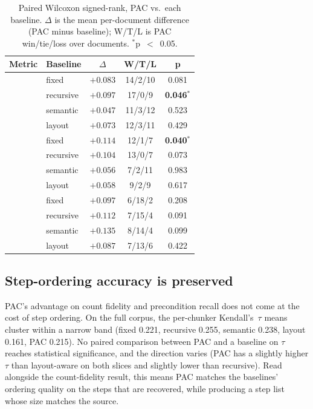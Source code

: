 \documentclass[fleqn,10pt]{wlscirep}
\begin{document}
\begin{table}[ht]
\centering
\caption{Paired Wilcoxon signed-rank, PAC vs.\ each baseline.
$\Delta$ is the mean per-document difference (PAC minus baseline);
W/T/L is PAC win/tie/loss over documents. $^{*}$p~$<$~0.05.}
\label{tab:wilcoxon}
\begin{tabular}{llccc}
\toprule
Metric & Baseline & $\Delta$ & W/T/L & p \\
\midrule
{}
 & fixed     & $+0.083$ & 14/2/10 & 0.081 \\
 & recursive & $+0.097$ & 17/0/9  & \textbf{0.046}$^{*}$ \\
 & semantic  & $+0.047$ & 11/3/12 & 0.523 \\
 & layout    & $+0.073$ & 12/3/11 & 0.429 \\
\midrule
{}
 & fixed     & $+0.114$ & 12/1/7  & \textbf{0.040}$^{*}$ \\
 & recursive & $+0.104$ & 13/0/7  & 0.073 \\
 & semantic  & $+0.056$ &  7/2/11 & 0.983 \\
 & layout    & $+0.058$ &  9/2/9  & 0.617 \\
\midrule
{}
 & fixed     & $+0.097$ &  6/18/2 & 0.208 \\
 & recursive & $+0.112$ &  7/15/4 & 0.091 \\
 & semantic  & $+0.135$ &  8/14/4 & 0.099 \\
 & layout    & $+0.087$ &  7/13/6 & 0.422 \\
\bottomrule
\end{tabular}
\end{table}

\subsection*{Step-ordering accuracy is preserved}

PAC's advantage on count fidelity and precondition recall does not come
at the cost of step ordering. On the full corpus, the per-chunker
Kendall's~$\tau$ means cluster within a narrow band (fixed 0.221,
recursive 0.255, semantic 0.238, layout 0.161, PAC 0.215). No paired
comparison between PAC and a baseline on $\tau$ reaches statistical
significance, and the direction varies (PAC has a slightly higher
$\tau$ than layout-aware on both slices and slightly lower than
recursive). Read alongside the count-fidelity result, this means PAC
matches the baselines' ordering quality on the steps that are
recovered, while producing a step list whose size matches the source.
\end{document}
